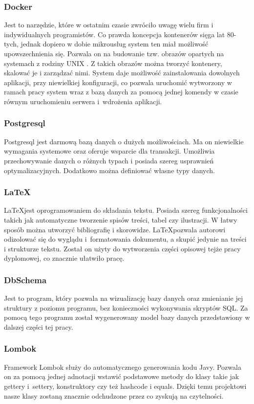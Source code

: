 \subsubsection{Docker}
Jest to narzędzie, które w ostatnim czasie zwróciło uwagę wielu firm i indywidualnych programistów. Co prawda koncepcja kontenerów sięga lat 80-tych, jednak dopiero w dobie mikrousług system ten miał możliwość upowszechnienia się. Pozwala on na budowanie tzw. obrazów opartych na systemach z rodziny UNIX \cite{DOCKER}. Z takich obrazów można tworzyć kontenery, skalować je i zarządzać nimi. System daje możliwość zainstalowania dowolnych aplikacji, przy niewielkiej konfiguracji, co pozwala uruchomić wytworzony w ramach pracy system wraz z bazą danych za pomocą jednej komendy w czasie równym uruchomieniu serwera i~wdrożenia aplikacji.

\subsubsection{Postgresql}
Postgresql jest darmową bazą danych o dużych możliwościach. Ma on niewielkie wymagania systemowe oraz oferuje wsparcie dla transakcji. Umożliwia przechowywanie danych o różnych typach i posiada szereg usprawnień optymalizacyjnych. Dodatkowo można definiować własne typy danych.

\subsubsection{\LaTeX}
\LaTeX jest oprogramowaniem do składania tekstu. Posiada szereg funkcjonalności takich jak automatyczne tworzenie spisów treści, tabel czy ilustracji. W łatwy sposób można utworzyć bibliografię i skorowidze. \LaTeX pozwala autorowi odizolować się do wyglądu i~formatowania dokumentu, a skupić jedynie na treści i strukturze tekstu. Został on użyty do wytworzenia części opisowej tejże pracy dyplomowej, co znacznie ułatwiło pracę.

\subsubsection{DbSchema}
Jest to program, który pozwala na wizualizację bazy danych oraz zmienianie jej struktury z poziomu programu, bez konieczności wykonywania skryptów SQL. Za pomocą tego programu został wygenerowany model bazy danych przedstawiony w dalszej części tej pracy.

\subsubsection{Lombok}
Framework Lombok służy do automatycznego generowania kodu Javy. Pozwala on za pomocą jednej adnotacji wstawić podstawowe metody do klasy takie jak gettery i~settery, konstruktory czy też hashcode i equals. Dzięki temu projektowi nasze klasy zostaną znacznie odchudzone przez co zyskują na czytelności.
